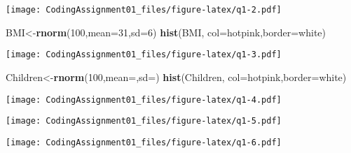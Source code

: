 \documentclass[
]{article}
\newenvironment{Shaded}{\begin{snugshade}}{\end{snugshade}}
\newcommand{\AttributeTok}[1]{\textcolor[rgb]{0.13,0.29,0.53}{#1}}
\newcommand{\CommentTok}[1]{\textcolor[rgb]{0.56,0.35,0.01}{\textit{#1}}}
\newcommand{\DecValTok}[1]{\textcolor[rgb]{0.00,0.00,0.81}{#1}}
\newcommand{\FunctionTok}[1]{\textcolor[rgb]{0.13,0.29,0.53}{\textbf{#1}}}
\newcommand{\NormalTok}[1]{#1}
\newcommand{\OtherTok}[1]{\textcolor[rgb]{0.56,0.35,0.01}{#1}}
\newcommand{\SpecialCharTok}[1]{\textcolor[rgb]{0.81,0.36,0.00}{\textbf{#1}}}
\newcommand{\StringTok}[1]{\textcolor[rgb]{0.31,0.60,0.02}{#1}}
\begin{document}
\texttt{[image: CodingAssignment01\_files/figure-latex/q1-2.pdf]}

\begin{Shaded}
\begin{Highlighting}[]
\NormalTok{BMI}\OtherTok{\textless{}{-}}\FunctionTok{rnorm}\NormalTok{(}\DecValTok{100}\NormalTok{,}\AttributeTok{mean=}\DecValTok{31}\NormalTok{,}\AttributeTok{sd=}\DecValTok{6}\NormalTok{)}
\FunctionTok{hist}\NormalTok{(BMI, }\AttributeTok{col=}\StringTok{\textquotesingle{}hotpink\textquotesingle{}}\NormalTok{,}\AttributeTok{border=}\StringTok{\textquotesingle{}white\textquotesingle{}}\NormalTok{)}
\end{Highlighting}
\end{Shaded}

\texttt{[image: CodingAssignment01\_files/figure-latex/q1-3.pdf]}

\begin{Shaded}
\begin{Highlighting}[]
\NormalTok{Children}\OtherTok{\textless{}{-}}\FunctionTok{rnorm}\NormalTok{(}\DecValTok{100}\NormalTok{,}\AttributeTok{mean=}\NormalTok{,}\AttributeTok{sd=}\NormalTok{)}
\FunctionTok{hist}\NormalTok{(Children, }\AttributeTok{col=}\StringTok{\textquotesingle{}hotpink\textquotesingle{}}\NormalTok{,}\AttributeTok{border=}\StringTok{\textquotesingle{}white\textquotesingle{}}\NormalTok{)}
\end{Highlighting}
\end{Shaded}

\texttt{[image: CodingAssignment01\_files/figure-latex/q1-4.pdf]}

\begin{Shaded}
\end{Shaded}

\texttt{[image: CodingAssignment01\_files/figure-latex/q1-5.pdf]}

\begin{Shaded}
\end{Shaded}

\texttt{[image: CodingAssignment01\_files/figure-latex/q1-6.pdf]}
\end{document}
